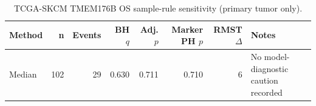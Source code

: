 \begin{table}[t]
\centering
\caption{TCGA-SKCM TMEM176B OS sample-rule sensitivity (primary tumor only).}
\label{tab:skcm-tmem176b-os-primary-tumor-only}
\begin{tabular}{lrrrrrrl}
\toprule
Method & n & Events & BH $q$ & Adj. $p$ & Marker PH $p$ & RMST $\Delta$ & Notes \\
\midrule
Median & 102 & 29 & 0.630 & 0.711 & 0.710 & 6 & No model-diagnostic caution recorded \\
\bottomrule
\end{tabular}
\end{table}
